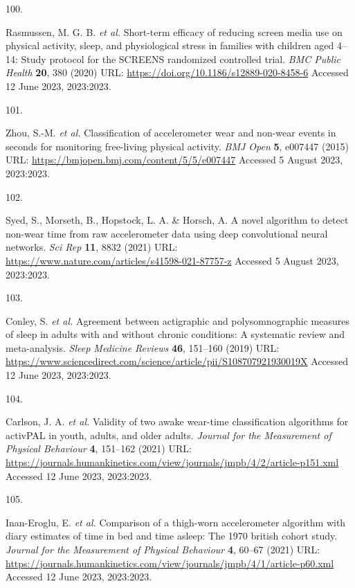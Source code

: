\documentclass[
  10pt,
]{scrbook}
\newlength{\cslhangindent}
\newlength{\csllabelwidth}
\newlength{\cslentryspacingunit} %
\newenvironment{CSLReferences}[2] %
 {%
  \setlength{\parindent}{0pt}
  \ifodd #1
  \let\oldpar\par
  \def\par{\hangindent=\cslhangindent\oldpar}
  \fi
  \setlength{\parskip}{#2\cslentryspacingunit}
 }%
 {}
\newcommand{\CSLLeftMargin}[1]{\parbox[t]{\csllabelwidth}{#1}}
\newcommand{\CSLRightInline}[1]{\parbox[t]{\linewidth - \csllabelwidth}{#1}\break}
\begin{document}
\begin{CSLReferences}{0}{0}
\leavevmode{}%
\CSLLeftMargin{100. }%
\CSLRightInline{Rasmussen, M. G. B. \emph{et al.} Short-term efficacy of
reducing screen media use on physical activity, sleep, and physiological
stress in families with children aged 4--14: Study protocol for the
{SCREENS} randomized controlled trial. \emph{{BMC} Public Health}
\textbf{20}, 380 (2020) URL:
\url{https://doi.org/10.1186/s12889-020-8458-6} Accessed 12 June 2023,
2023:2023.}

\leavevmode{}%
\CSLLeftMargin{101. }%
\CSLRightInline{Zhou, S.-M. \emph{et al.} Classification of
accelerometer wear and non-wear events in seconds for monitoring
free-living physical activity. \emph{{BMJ} Open} \textbf{5}, e007447
(2015) URL: \url{https://bmjopen.bmj.com/content/5/5/e007447} Accessed 5
August 2023, 2023:2023.}

\leavevmode{}%
\CSLLeftMargin{102. }%
\CSLRightInline{Syed, S., Morseth, B., Hopstock, L. A. \& Horsch, A. A
novel algorithm to detect non-wear time from raw accelerometer data
using deep convolutional neural networks. \emph{Sci Rep} \textbf{11},
8832 (2021) URL:
\url{https://www.nature.com/articles/s41598-021-87757-z} Accessed 5
August 2023, 2023:2023.}

\leavevmode{}%
\CSLLeftMargin{103. }%
\CSLRightInline{Conley, S. \emph{et al.} Agreement between actigraphic
and polysomnographic measures of sleep in adults with and without
chronic conditions: A systematic review and meta-analysis. \emph{Sleep
Medicine Reviews} \textbf{46}, 151--160 (2019) URL:
\url{https://www.sciencedirect.com/science/article/pii/S108707921930019X}
Accessed 12 June 2023, 2023:2023.}

\leavevmode{}%
\CSLLeftMargin{104. }%
\CSLRightInline{Carlson, J. A. \emph{et al.} Validity of two awake
wear-time classification algorithms for {activPAL} in youth, adults, and
older adults. \emph{Journal for the Measurement of Physical Behaviour}
\textbf{4}, 151--162 (2021) URL:
\url{https://journals.humankinetics.com/view/journals/jmpb/4/2/article-p151.xml}
Accessed 12 June 2023, 2023:2023.}

\leavevmode{}%
\CSLLeftMargin{105. }%
\CSLRightInline{Inan-Eroglu, E. \emph{et al.} Comparison of a thigh-worn
accelerometer algorithm with diary estimates of time in bed and time
asleep: The 1970 british cohort study. \emph{Journal for the Measurement
of Physical Behaviour} \textbf{4}, 60--67 (2021) URL:
\url{https://journals.humankinetics.com/view/journals/jmpb/4/1/article-p60.xml}
Accessed 12 June 2023, 2023:2023.}


\end{CSLReferences}
\end{document}
